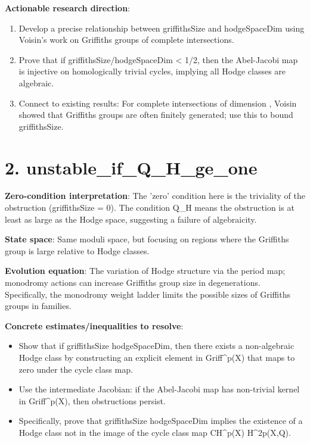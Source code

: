\documentclass[11pt]{article}
\begin{document}
\textbf{Actionable research direction}:
\begin{enumerate}
\item Develop a precise relationship between griffithsSize and hodgeSpaceDim using Voisin's work on Griffiths groups of complete intersections.
\item Prove that if griffithsSize/hodgeSpaceDim < 1/2, then the Abel-Jacobi map is injective on homologically trivial cycles, implying all Hodge classes are algebraic.
\item Connect to existing results: For complete intersections of dimension , Voisin showed that Griffiths groups are often finitely generated; use this to bound griffithsSize.
\end{enumerate}

\section{2. unstable\_if\_Q\_H\_ge\_one}

\textbf{Zero-condition interpretation}: The 'zero' condition here is the triviality of the obstruction (griffithsSize = 0). The condition Q\_H  means the obstruction is at least as large as the Hodge space, suggesting a failure of algebraicity.

\textbf{State space}: Same moduli space, but focusing on regions where the Griffiths group is large relative to Hodge classes.

\textbf{Evolution equation}: The variation of Hodge structure via the period map; monodromy actions can increase Griffiths group size in degenerations. Specifically, the monodromy weight ladder limits the possible sizes of Griffiths groups in families.

\textbf{Concrete estimates/inequalities to resolve}:
\begin{itemize}
\item Show that if griffithsSize \geq hodgeSpaceDim, then there exists a non-algebraic Hodge class by constructing an explicit element in Griff^{p}(X) that maps to zero under the cycle class map.
\item Use the intermediate Jacobian: if the Abel-Jacobi map has non-trivial kernel in Griff^{p}(X), then obstructions persist.
\item Specifically, prove that griffithsSize \geq hodgeSpaceDim implies the existence of a Hodge class not in the image of the cycle class map CH^{p}(X) \rightarrow H^{2p}(X,Q).
\end{itemize}
\end{document}
